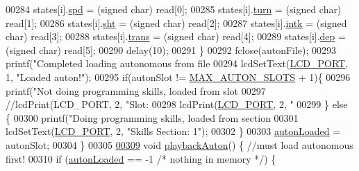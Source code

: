 \begin{DoxyCode}
{{{{{{{{{{{{{{{{{{{{{{{{{{{{{{{{{{{00284         states[i].\hyperlink{structjoy_state_a7867156ddb5bc22d57010c5af00c98af}{spd} = (\textcolor{keywordtype}{signed} char) read[0];
00285         states[i].\hyperlink{structjoy_state_aacdbb758b97190220423402f63020483}{turn} = (\textcolor{keywordtype}{signed} char) read[1];
00286         states[i].\hyperlink{structjoy_state_a751363be4e40b27bcbe558f41a15fe91}{sht} = (\textcolor{keywordtype}{signed} char) read[2];
00287         states[i].\hyperlink{structjoy_state_a2314ed43be31ccc565381efd8398b921}{intk} = (\textcolor{keywordtype}{signed} char) read[3];
00288         states[i].\hyperlink{structjoy_state_acc4f7bae078e8c8b7840cda61382c7cf}{trans} = (\textcolor{keywordtype}{signed} char) read[4];
00289         states[i].\hyperlink{structjoy_state_a3ba5ee3c4eec0e2ee03338b397a17958}{dep} = (\textcolor{keywordtype}{signed} char) read[5];
00290         delay(10);
00291     \}
00292     fclose(autonFile);
00293     printf(\textcolor{stringliteral}{"Completed loading autonomous from file %
00294     lcdSetText(\hyperlink{lcdmsg_8h_abcf42bd88b3c36193f301ca25b033875}{LCD\_PORT}, 1, \textcolor{stringliteral}{"Loaded auton!"});
00295     \textcolor{keywordflow}{if}(autonSlot != \hyperlink{autonrecorder_8h_a5173a11a545cb4020fdd139552dc15c1}{MAX\_AUTON\_SLOTS} + 1)\{
00296         printf(\textcolor{stringliteral}{"Not doing programming skills, loaded from slot %
00297         \textcolor{comment}{//lcdPrint(LCD\_PORT,   2, "Slot: %
00298         lcdPrint(\hyperlink{lcdmsg_8h_abcf42bd88b3c36193f301ca25b033875}{LCD\_PORT}, 2, \textcolor{stringliteral}{"%
00299     \} \textcolor{keywordflow}{else} \{
00300         printf(\textcolor{stringliteral}{"Doing programming skills, loaded from section %
00301         lcdSetText(\hyperlink{lcdmsg_8h_abcf42bd88b3c36193f301ca25b033875}{LCD\_PORT}, 2, \textcolor{stringliteral}{"Skills Section: 1"});
00302     \}
00303     \hyperlink{autonrecorder_8c_a4e72d907ee74449b71b5e20943f4217e}{autonLoaded} = autonSlot;
00304 \}
00305 
\hypertarget{autonrecorder_8c_source.tex_l00309}{}\hyperlink{autonrecorder_8h_ae592a73a6bd9b2adcaa58a8ee82daaa0}{00309} \textcolor{keywordtype}{void} \hyperlink{autonrecorder_8c_ae592a73a6bd9b2adcaa58a8ee82daaa0}{playbackAuton}() \{ \textcolor{comment}{//must load autonomous first!}
00310     \textcolor{keywordflow}{if} (\hyperlink{autonrecorder_8c_a4e72d907ee74449b71b5e20943f4217e}{autonLoaded} == -1 \textcolor{comment}{/* nothing in memory */}) \{
}}}}}}}}}}}}}}}}}}}}}}}}}}}}}}}}}}}}}}}}
\end{DoxyCode}
